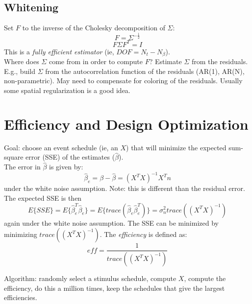 \documentclass{article}
\begin{document}
\subsection{Whitening}

Set $F$ to the inverse of the Cholesky decomposition of $\Sigma$:
\begin{equation}
F = \Sigma^{-\frac{1}{2}}
\end{equation}
\begin{equation}
F \Sigma F^T = I
\end{equation}
This is a {\em fully efficient estimator} (ie, $DOF = N_t - N_\beta$).\\

\noindent
Where does $\Sigma$ come from in order to compute $F$? Estimate $\Sigma$
from the residuals. E.g., build $\Sigma$ from the autocorrelation
function of the residuals (AR(1), AR(N), non-parametric). May need to
compensate for coloring of the residuals. Usually some spatial
regularization is a good idea.

\section{Efficiency and Design Optimization}

\noindent
Goal: choose an event schedule (ie, an $X$) that will minimize the
expected sum-square error (SSE) of the estimates ($\hat\beta$). \\

\noindent
The error in $\hat\beta$ is given by:
\begin{equation}
\hat\beta_e = \beta - \hat\beta = (X^T X)^{-1} X^T n
\end{equation}
under the white noise assumption. Note: this is different than the
residual error.\\

\noindent
The expected SSE is then
\begin{equation}
E\{SSE\} = E\{\hat\beta_e^T \hat\beta_e\} = 
  E\{trace(\hat\beta_e \hat\beta_e^T)\} =
  \sigma_n^2 trace((X^T X)^{-1})
\end{equation}
again under the white noise assumption. The SSE can be minimized by
minimizing $trace((X^T X)^{-1})$. The {\em efficiency} is defined as:
\begin{equation}
eff = \frac{1}{trace((X^T X)^{-1})}
\end{equation}

\noindent
Algorithm: randomly select a stimulus schedule, compute $X$, compute
the efficiency, do this a million times, keep the schedules that give
the largest efficiencies. 
\end{document}
